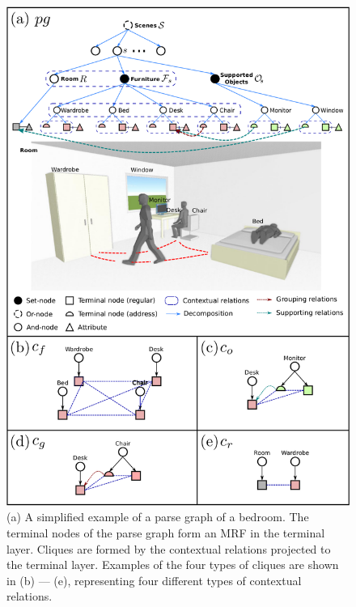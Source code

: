 \documentclass[10pt]{article}
\begin{document}
\setcounter{figure}{2}
\begin{figure}[!htpb]
  \centering
  \includegraphics[width=0.6\linewidth]{fig_3.png}
  \caption{(a) A simplified example of a parse graph of a bedroom. The terminal
    nodes of the parse graph form an MRF in the terminal layer. Cliques are
    formed by the contextual relations projected to the terminal layer.
    Examples of the four types of cliques are shown in (b) --- (e),
    representing four different types of contextual relations.}%
  \label{fig:3}
\end{figure}


\end{document}
